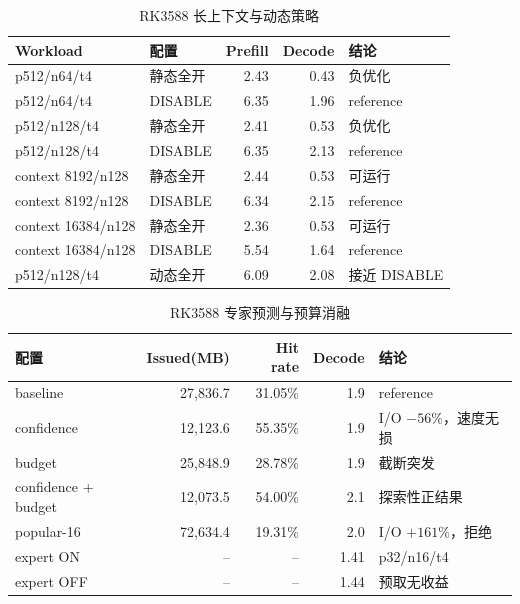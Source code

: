 \begin{table}[H]
  \centering
  \scriptsize
  \caption{RK3588 长上下文与动态策略}
  \label{tab:appendix-rk-long}
  \begin{tabular}{p{}p{}rrp{}}
    \toprule
    Workload & 配置 & Prefill & Decode & 结论 \\
    \midrule
    p512/n64/t4 & 静态全开 & 2.43 & 0.43 & 负优化 \\
    p512/n64/t4 & DISABLE & 6.35 & 1.96 & reference \\
    p512/n128/t4 & 静态全开 & 2.41 & 0.53 & 负优化 \\
    p512/n128/t4 & DISABLE & 6.35 & 2.13 & reference \\
    context 8192/n128 & 静态全开 & 2.44 & 0.53 & 可运行 \\
    context 8192/n128 & DISABLE & 6.34 & 2.15 & reference \\
    context 16384/n128 & 静态全开 & 2.36 & 0.53 & 可运行 \\
    context 16384/n128 & DISABLE & 5.54 & 1.64 & reference \\
    p512/n128/t4 & 动态全开 & 6.09 & 2.08 & 接近 DISABLE \\
    \bottomrule
  \end{tabular}
\end{table}

\begin{table}[H]
  \centering
  \scriptsize
  \caption{RK3588 专家预测与预算消融}
  \label{tab:appendix-rk-expert}
  \begin{tabular}{p{}rrrp{}}
    \toprule
    配置 & Issued(MB) & Hit rate & Decode & 结论 \\
    \midrule
    baseline & 27,836.7 & 31.05\% & 1.9 & reference \\
    confidence & 12,123.6 & 55.35\% & 1.9 & I/O $-56\%$，速度无损 \\
    budget & 25,848.9 & 28.78\% & 1.9 & 截断突发 \\
    confidence + budget & 12,073.5 & 54.00\% & 2.1 & 探索性正结果 \\
    popular-16 & 72,634.4 & 19.31\% & 2.0 & I/O $+161\%$，拒绝 \\
    expert ON & -- & -- & 1.41 & p32/n16/t4 \\
    expert OFF & -- & -- & 1.44 & 预取无收益 \\
    \bottomrule
  \end{tabular}
\end{table}

